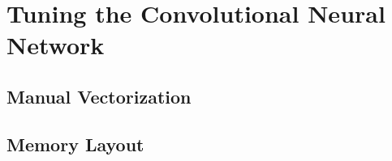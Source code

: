 
\section{Tuning the Convolutional Neural Network}
\label{sec-tuning}

\subsection{Manual Vectorization}
\label{sec-tuning-vectorization}






\subsection{Memory Layout}
\label{sec-tuning-memory}


